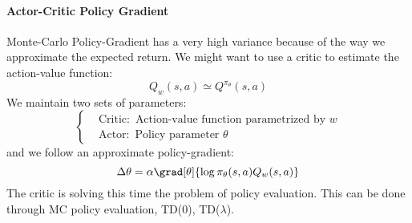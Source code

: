 {{{{				\paragraph{Actor-Critic Policy Gradient} Monte-Carlo Policy-Gradient has a very high variance because of the way we approximate the expected return. We might want to use a critic to estimate the action-value function:
					\begin{equation}
						Q_w(s,a) \simeq Q^{\pi_\theta}(s,a)
					\end{equation}
					We maintain two sets of parameters:
					\begin{equation}
						\left\{\begin{aligned}
						&\text{Critic: } \, \text{Action-value function parametrized by } w\\
						&\text{Actor: }\, \text{Policy parameter } \theta
						\end{aligned}\right.
					\end{equation}
					and we follow an approximate policy-gradient:
					\begin{equation}
						\Delta \theta = \alpha \grad[\theta]{\log\pi_\theta(s,a) Q_w(s,a)}
					\end{equation}
					The critic is solving this time the problem of policy evaluation. This can be done through MC policy evaluation, TD(0), TD($\lambda$). 


}}}}
